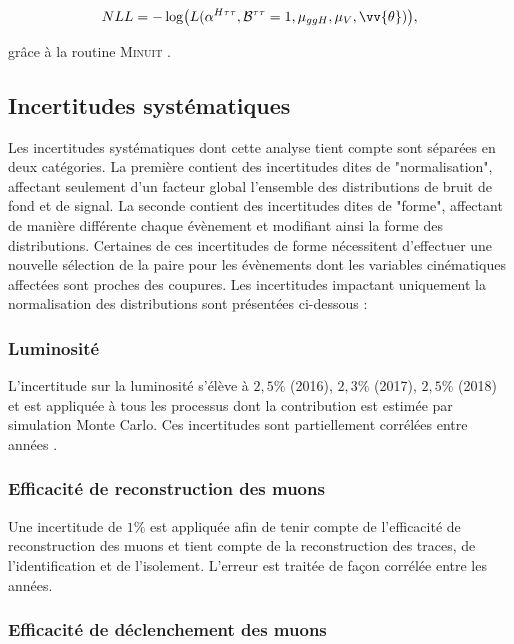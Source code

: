 \begin{equation}
\label{negLog}
    NLL=-\log\bigl(L(\alpha^{H\tau\tau},\mathcal{B}^{\tau\tau}=1,\mu_{ggH},\mu_{V},\vv{\theta})\bigr),
\end{equation}

grâce à la routine \textsc{Minuit} \cite{minuit}.

\subsection{Incertitudes systématiques}
\label{systematics}

Les incertitudes systématiques dont cette analyse tient compte sont séparées en deux catégories. La première contient des incertitudes dites de "normalisation", affectant seulement d'un facteur global l'ensemble des distributions de bruit de fond et de signal. La seconde contient des incertitudes dites de "forme", affectant de manière différente chaque évènement et modifiant ainsi la forme des distributions. Certaines de ces incertitudes de forme nécessitent d'effectuer une nouvelle sélection de la paire pour les évènements dont les variables cinématiques affectées sont proches des coupures. Les incertitudes impactant uniquement la normalisation des distributions sont présentées ci-dessous :

\subsubsection{ Luminosité}

L'incertitude sur la luminosité s'élève à $2,5\%$ (2016), $2,3\%$ (2017), $2,5\%$ (2018) et est appliquée à tous les processus dont la contribution est estimée par simulation Monte Carlo. Ces incertitudes sont partiellement corrélées entre années \cite{Lumi}.

\subsubsection{ Efficacité de reconstruction des muons}

Une incertitude de $1\%$ est appliquée afin de tenir compte de l'efficacité de reconstruction des muons et tient compte de la reconstruction des traces, de l'identification et de l'isolement. L'erreur est traitée de façon corrélée entre les années.

\subsubsection{ Efficacité de déclenchement des muons}

